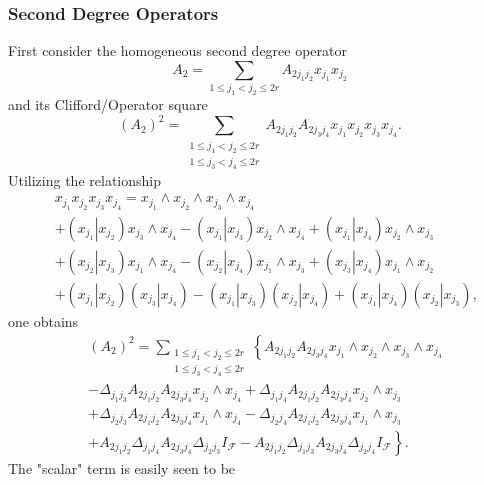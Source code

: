 \documentclass[aps, preprint]{revtex4}
\begin{document}
\subsubsection{Second Degree Operators}
First consider the homogeneous second degree operator
\begin{equation}A_{2} =\sum _{1 \leq j_{1} <j_{2} \leq 2 r}A_{2 j_{1} j_{2}} x_{j_{1}} x_{j_{2}}
\end{equation}and its Clifford/Operator square
\begin{equation}\left (A_{2}\right )^{2} =\sum _{\begin{array}{c}1 \leq j_{1} <j_{2} \leq 2 r \\
1 \leq j_{3} <j_{4} \leq 2 r\end{array}}A_{2 j_{1} j_{2}} A_{2 j_{3} j_{4}} x_{j_{1}} x_{j_{2}} x_{j_{3}} x_{j_{4}}\text{.}
\end{equation}Utilizing the relationship
\begin{align} & x_{j_{1}} x_{j_{2}} x_{j_{3}} x_{j_{4}} =x_{j_{1}} \wedge x_{j_{2}} \wedge x_{j_{3}} \wedge x_{j_{4}} \nonumber  \\
 &  +\left (\left .x_{j_{1}}\right \vert x_{j_{2}}\right ) x_{j_{3}} \wedge x_{j_{4}} -\left (\left .x_{j_{1}}\right \vert x_{j_{3}}\right ) x_{j_{2}} \wedge x_{j_{4}} +\left (\left .x_{j_{1}}\right \vert x_{j_{4}}\right ) x_{j_{2}} \wedge x_{j_{3}} \nonumber  \\
 &  +\left (\left .x_{j_{2}}\right \vert x_{j_{3}}\right ) x_{j_{1}} \wedge x_{j_{4}} -\left (\left .x_{j_{2}}\right \vert x_{j_{4}}\right ) x_{j_{1}} \wedge x_{j_{3}} +\left (\left .x_{j_{3}}\right \vert x_{j_{4}}\right ) x_{j_{1}} \wedge x_{j_{2}} \nonumber  \\
 &  +\left (\left .x_{j_{1}}\right \vert x_{j_{2}}\right ) \left (\left .x_{j_{3}}\right \vert x_{j_{4}}\right ) -\left (\left .x_{j_{1}}\right \vert x_{j_{3}}\right ) \left (\left .x_{j_{2}}\right \vert x_{j_{4}}\right ) +\left (\left .x_{j_{1}}\right \vert x_{j_{4}}\right ) \left (\left .x_{j_{2}}\right \vert x_{j_{3}}\right )\text{,}\end{align}one obtains
\begin{align} & \left (A_{2}\right )^{2} =\sum _{\begin{array}{c}1 \leq j_{1} <j_{2} \leq 2 r \\
1 \leq j_{3} <j_{4} \leq 2 r\end{array}}\left \{A_{2 j_{1} j_{2}} A_{2 j_{3} j_{4}} x_{j_{1}} \wedge x_{j_{2}} \wedge x_{j_{3}} \wedge x_{j_{4}}\right . \nonumber  \\
 &  - \Delta _{j_{1} j_{3}}A_{2 j_{1} j_{2}} A_{2 j_{3} j_{4}} x_{j_{2}} \wedge x_{j_{4}} + \Delta _{j_{1} j_{4}}A_{2 j_{1} j_{2}} A_{2 j_{3} j_{4}} x_{j_{2}} \wedge x_{j_{3}} \nonumber  \\
 &  + \Delta _{j_{2} j_{3}}A_{2 j_{1} j_{2}} A_{2 j_{3} j_{4}} x_{j_{1}} \wedge x_{j_{4}} - \Delta _{j_{2} j_{4}}A_{2 j_{1} j_{2}} A_{2 j_{3} j_{4}} x_{j_{1}} \wedge x_{j_{3}} \nonumber  \\
 &  +\left .A_{2 j_{1} j_{2}}  \Delta _{j_{1} j_{4}}A_{2 j_{3} j_{4}}  \Delta _{j_{2} j_{3}}I_{\mathcal{F}} -A_{2 j_{1} j_{2}}  \Delta _{j_{1} j_{3}}A_{2 j_{3} j_{4}}  \Delta _{j_{2} j_{4}}I_{\mathcal{F}}\right \}\text{.}\end{align}The "scalar" term is easily seen to be
\end{document}
